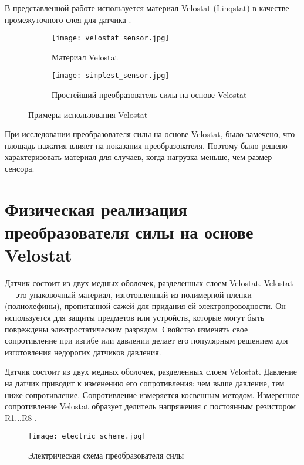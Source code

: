В представленной работе используется материал Velostat (Linqstat)  в качестве промежуточного слоя для датчика .

\begin{figure}[H]
    \begin{subfigure}[t]{0.9\textwidth}
        \centering\texttt{[image: velostat\_sensor.jpg]}
        \caption{Материал Velostat}
        \label{fig:velostat_sensor.jpg}
    \end{subfigure}

    \begin{subfigure}[t]{0.95\textwidth}
        \centering\texttt{[image: simplest\_sensor.jpg]}
        \caption{Простейший преобразователь силы на основе Velostat}
        \label{fig:simplest_sensor.jpg}
    \end{subfigure}
    \caption{Примеры использования Velostat}
\end{figure}

При исследовании преобразователя силы на основе Velostat, было замечено, что площадь нажатия влияет на показания преобразователя. Поэтому было решено характеризовать материал для случаев, когда нагрузка меньше, чем размер сенсора.

\section{Физическая реализация преобразователя силы на основе Velostat}

Датчик состоит из двух медных оболочек, разделенных слоем Velostat. Velostat --- это упаковочный материал, изготовленный из полимерной пленки (полиолефины), пропитанной сажей для придания ей электропроводности. Он используется для защиты предметов или устройств, которые могут быть повреждены электростатическим разрядом. Свойство изменять свое сопротивление при изгибе или давлении делает его популярным решением для изготовления недорогих датчиков давления.

Датчик состоит из двух медных оболочек, разделенных слоем Velostat. Давление на датчик приводит к изменению его сопротивления: чем выше давление, тем ниже сопротивление. Сопротивление измеряется косвенным методом. Измеренное сопротивление Velostat образует делитель напряжения с постоянным резистором R1...R8 .


\begin{figure}[H]
\centering\texttt{[image: electric\_scheme.jpg]}\\
\caption{Электрическая схема преобразователя силы}
\label{fig:el_scheme}
\end{figure}

